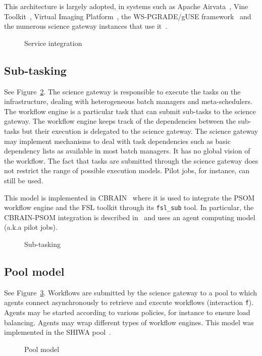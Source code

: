 \documentclass[preprint,3p,twocolumn]{elsarticle}
\begin{document}
This architecture is largely adopted, in systems such as Apache
Airvata~\cite{marru2011apache}, Vine
Toolkit~\cite{DBLP:journals/scpe/SzejnfeldDKKKKLPTWDNW10}, Virtual
Imaging Platform~\cite{GLAT-13}, the WS-PGRADE/gUSE
framework~\cite{Kacsuk2012} and the numerous science gateway instances
that use it~\cite{kacsuk2014science}.
\begin{figure}
\centering
\def\svgwidth{0.5\columnwidth}

\caption{Service integration}
\label{archi:service}
\end{figure}

\subsection{Sub-tasking}

See Figure~\ref{archi:sub-task}. The science gateway is responsible to
execute the tasks on the infrastructure, dealing with heterogeneous
batch managers and meta-schedulers. The workflow engine is a
particular task that can submit sub-tasks to the science gateway. The
workflow engine keeps track of the dependencies between the sub-tasks
but their execution is delegated to the science gateway. The science
gateway may implement mechanisms to deal with task dependencies such
as basic dependency lists as available in most batch managers. It has
no global vision of the workflow. The fact that tasks are submitted
through the science gateway does not restrict the range of possible
execution models. Pilot jobs, for instance, can still be used.

This model is implemented in CBRAIN~\cite{SHER-14} where it is used to
integrate the PSOM workflow engine and the FSL toolkit through its
\texttt{fsl\_sub} tool. In particular, the CBRAIN-PSOM integration is
described in~\cite{GLAT-16} and uses an agent computing model (a.k.a pilot
jobs).
\begin{figure}
\centering
\def\svgwidth{0.5\columnwidth}

\caption{Sub-tasking}
\label{archi:sub-task}
\end{figure}

\subsection{Pool model}

See Figure~\ref{archi:agent}. Workflows are submitted by the science
gateway to a pool to which agents connect asynchronously to retrieve
and execute workflows (interaction \texttt{f}). Agents may be started according to various
policies, for instance to ensure load balancing. Agents may wrap
different types of workflow engines. This model was implemented in the
SHIWA pool~\cite{ROGE-13}.
\begin{figure}
\centering
\def\svgwidth{0.8\columnwidth}

\caption{Pool model}
\label{archi:agent}
\end{figure}
\end{document}
